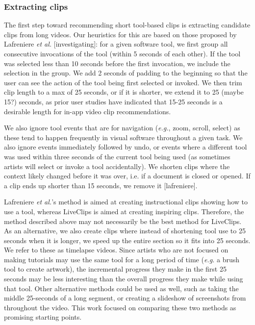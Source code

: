 \subsubsection{Extracting clips}
The first step toward recommending short tool-based clips is extracting candidate clips from long videos. Our heuristics for this are based on those proposed by Lafreniere \textit{et al.} [investigating]: for a given software tool, we first group all consecutive invocations of the tool (within 5 seconds of each other). If the tool was selected less than 10 seconds before the first invocation, we include the selection in the group. We add 2 seconds of padding to the beginning so that the user can see the action of the tool being first selected or invoked. We then trim clip length to a max of 25 seconds, or if it is shorter, we extend it to 25 (maybe 15?) seconds, as prior user studies have indicated that 15-25 seconds is a desirable length for in-app video clip recommendations.

We also ignore tool events that are for navigation (\textit{e.g.}, zoom, scroll, select) as these tend to happen frequently in visual software throughout a given task. We also ignore events immediately followed by undo, or events where a different tool was used within three seconds of the current tool being used (as sometimes artists will select or invoke a tool accidentally). We shorten clips where the context likely changed before it was over, i.e. if a document is closed or opened. If a clip ends up shorter than 15 seconds, we remove it [lafreniere].

Lafreniere \textit{et al.}'s method is aimed at creating instructional clips showing how to use a tool, whereas LiveClips is aimed at creating inspiring clips. Therefore, the method described above may not necessarily be the best method for LiveClips. As an alternative, we also create clips where instead of shortening tool use to 25 seconds when it is longer, we speed up the entire section so it fits into 25 seconds. We refer to these as timelapse videos. Since artists who are not focused on making tutorials may use the same tool for a long period of time (\textit{e.g.} a brush tool to create artwork), the incremental progress they make in the first 25 seconds may be less interesting than the overall progress they make while using that tool. Other alternative methods could be used as well, such as taking the middle 25-seconds of a long segment, or creating a slideshow of screenshots from throughout the video. This work focused on comparing these two methods as promising starting points.

